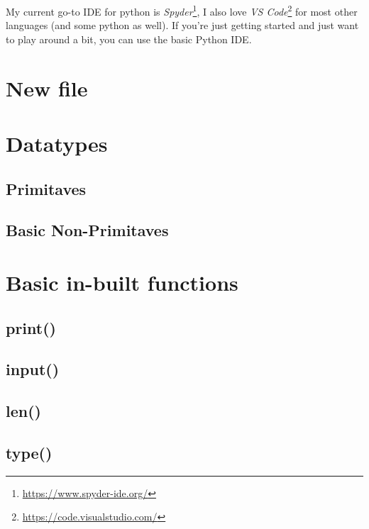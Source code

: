\documentclass[12pt,a4paper]{book}
\begin{document}
			My current go-to IDE for python is \textit{Spyder}\footnote{\url{https://www.spyder-ide.org/}}, I also love \textit{VS Code}\footnote{\url{https://code.visualstudio.com/}} for most other languages (and some python as well). If you're just getting started and just want to play around a bit, you can use the basic Python IDE.
		\section{New file}
		\section{Datatypes}
			\subsection{Primitaves} 
			\subsection{Basic Non-Primitaves} 

		\section{Basic in-built functions} 
			\subsection{print()}

			\subsection{input()}

			\subsection{len()}

			\subsection{type()}
\end{document}
